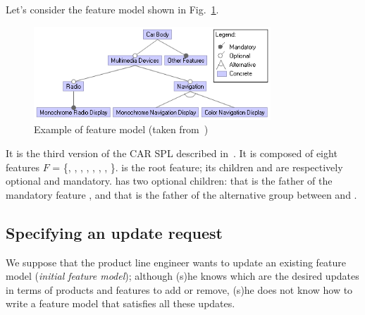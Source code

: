\begin{tikzborder}{\cite{Gargantini16:validation}}
\begin{tikzborder}{\cite{gargantini_combinatorial_2017}}
\begin{tikzborder}{\cite{gargantini_combinatorial_2017}}
\begin{tikzborder}{\cite{garn2019}}
\begin{tikzborder}{\cite{arcaini2019achieving}}
	\begin{exmp}\label{ex:initialFM}
		\bb
		Let's consider the feature model shown in Fig.~\ref{fig:fmExample}.
		\be
		\begin{figure}[!htb]
			\centering
			\includegraphics[height=3.5cm]{car2011}
			\caption{Example of feature model (taken from~\cite{Pleuss2012})}
			\label{fig:fmExample}
		\end{figure}
		\bb
		It is the third version of the CAR SPL described in~\cite{Pleuss2012}. It is composed of eight features $F$ = \{\CarBody, \MultimediaDevices, \OtherFeatures, \Radio, \Navigation, \MonochromeRadioDisplay, \MonochromeNavigationDisplay, \ColorNavigationDisplay{}\}. \CarBody is the root feature; its children \MultimediaDevices and \OtherFeatures are respectively optional and mandatory. \MultimediaDevices has two optional children: \Radio that is the father of the mandatory feature \MonochromeRadioDisplay, and \Navigation that is the father of the alternative group between \MonochromeNavigationDisplay and \ColorNavigationDisplay.\be
	\end{exmp}
	
	\subsection{Specifying an update request}\label{sec:updateRequest}
	
	\bb We suppose that the product line engineer wants to update an existing feature model \initFm ({\it initial feature model}); although (s)he knows which are the desired updates in terms of products and features to add or remove, (s)he does not know how to write a feature model \fmp that satisfies all these updates.
	

\end{tikzborder}
\end{tikzborder}
\end{tikzborder}
\end{tikzborder}
\end{tikzborder}
